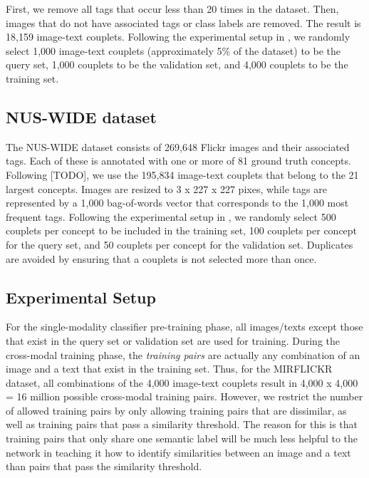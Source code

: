 \documentclass[letterpaper]{article}
\begin{document}
First, we remove all tags that occur less than 20 times in the dataset. Then, images that do not have associated tags or class labels are removed. The result is 18,159 image-text couplets. Following the experimental setup in \cite{cdq,chn}, we randomly select 1,000 image-text couplets (approximately 5\% of the dataset) to be the query set, 1,000 couplets to be the validation set, and 4,000 couplets to be the training set.

\subsection{NUS-WIDE dataset}

The NUS-WIDE dataset \cite{nuswide} consists of 269,648 Flickr images and their associated tags. Each of these is annotated with one or more of 81 ground truth concepts. Following [TODO], we use the 195,834 image-text couplets that belong to the 21 largest concepts. Images are resized to 3 x 227 x 227 pixes, while tags are represented by a 1,000 bag-of-words vector that corresponds to the 1,000 most frequent tags. Following the experimental setup in \cite{cdq,chn}, we randomly select 500 couplets per concept to be included in the training set, 100 couplets per concept for the query set, and 50 couplets per concept for the validation set. Duplicates are avoided by ensuring that a couplets is not selected more than once. 

\subsection{Experimental Setup}

For the single-modality classifier pre-training phase, all images/texts except those that exist in the query set or validation set are used for training. During the cross-modal training phase, the \emph{training pairs} are actually any combination of an image and a text that exist in the training set. Thus, for the MIRFLICKR dataset, all combinations of the 4,000 image-text couplets result in 4,000 x 4,000 = 16 million possible cross-modal training pairs. However, we restrict the number of allowed training pairs by only allowing training pairs that are dissimilar, as well as training pairs that pass a similarity threshold. The reason for this is that training pairs that only share one semantic label will be much less helpful to the network in teaching it how to identify similarities between an image and a text than pairs that pass the similarity threshold.
\end{document}
